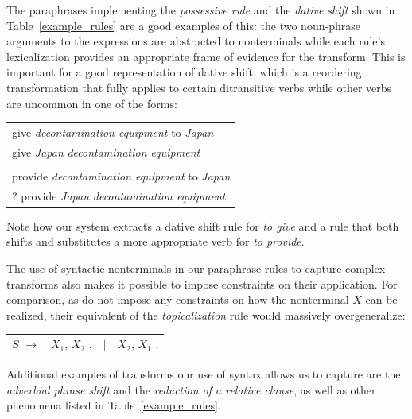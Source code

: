 \documentclass[11pt]{article}
\begin{document}
The paraphrases implementing the \emph{possessive rule} and the
\emph{dative shift} shown in Table~\ref{example_rules} are a good
examples of this: the two noun-phrase arguments to the expressions are
abstracted to nonterminals while each rule's lexicalization provides
an appropriate frame of evidence for the transform. This is important
for a good representation of dative shift, which is a reordering
transformation that fully applies to certain ditransitive verbs while
other verbs are uncommon in one of the forms:
\begin{center}
\begin{tabular}{l}
  give \emph{decontamination equipment} to \emph{Japan} \\
  give \emph{Japan} \emph{decontamination equipment} \\
  \vspace{-10pt}\\
  provide \emph{decontamination equipment} to \emph{Japan} \\
  ? provide \emph{Japan} \emph{decontamination equipment} \\
\end{tabular}
\end{center}
Note how our system extracts a dative shift rule for \emph{to give}
and a rule that both shifts and substitutes a more appropriate verb
for \emph{to provide}.

The use of syntactic nonterminals in our paraphrase rules to capture
complex transforms also makes it possible to impose constraints on
their application. For comparison, as  do not
impose any constraints on how the nonterminal $X$ can be realized,
their equivalent of the \emph{topicalization} rule would massively
overgeneralize:
\begin{center}
\begin{tabular}{rrcl}
  $\mathit{S}$ $\rightarrow$ & $\mathit{X}_1$,
  $\mathit{X}_2$ . & $\mid$ & $\mathit{X}_2$, $\mathit{X}_1$ . \\
\end{tabular}
\end{center}
Additional examples of transforms our use of syntax allows us to
capture are the \emph{adverbial phrase shift} and the \emph{reduction
  of a relative clause}, as well as other phenomena listed in
Table~\ref{example_rules}.
 
\end{document}
